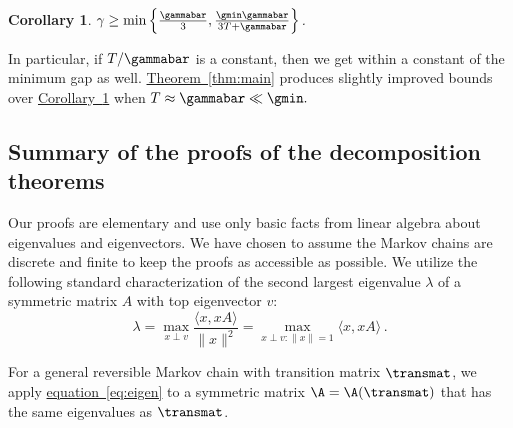 \documentclass[11pt]{article}
\newtheorem{corollary}[theorem]{Corollary}
\providecommand{\expref}[2]{\texorpdfstring{\hyperref[#2]{#1~\ref{#2}}}{#1~\ref{#2}}}
\providecommand{\expeqref}[2]{\texorpdfstring{\hyperref[#2]{#1~\eqref{#2}}}{#1~\eqref{#2}}}
\begin{document}
\begin{corollary}\label{cor:compareT}
 $\gamma\geq \min\left\{\frac{\gammabar}{3}, \frac{\gmin\gammabar}{3T+\gammabar}\right\}$.
\end{corollary}

\noindent In particular, if $T/\gammabar$ is a constant, then
we get within a constant of the minimum gap as well.  \expref{Theorem}{thm:main} produces
slightly improved bounds over \expref{Corollary}{cor:compareT} when
$T\approx \gammabar\ll \gmin.$  

\subsection{Summary of the proofs of the decomposition theorems}\label{sec:summary}
  
Our proofs are elementary and use only basic facts from linear algebra 
about eigenvalues and eigenvectors.  We have chosen to assume the 
Markov chains are discrete and finite to keep the proofs as accessible 
as possible. We utilize the following standard characterization of the 
second largest eigenvalue $\lambda$ of a symmetric matrix $A$ with top 
eigenvector $v$:
\begin{equation}\label{eq:eigen} 
\lambda = \max_{x\perp v}\frac{\langle x,xA\rangle}{\|x\|^2}
           = \max_{x\perp v:\|x\|=1}\langle x,xA\rangle\,.  
\end{equation} 

\noindent For a general reversible Markov chain with transition matrix 
$\transmat$, we apply \expeqref{equation}{eq:eigen} to a symmetric matrix 
$\A=\A(\transmat)$ that has the same eigenvalues as $\transmat$. 
\end{document}
